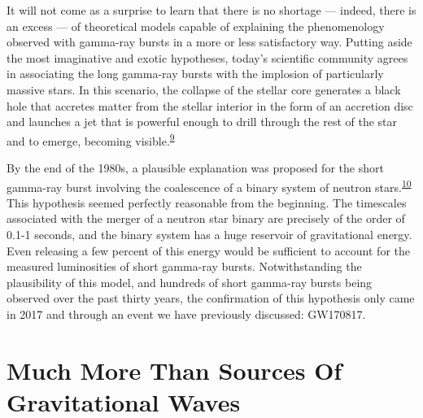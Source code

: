It will not come as a surprise to learn that there is no shortage --- indeed, there is
an excess --- of theoretical models capable of explaining the phenomenology observed
with gamma-ray bursts in a more or less satisfactory way. Putting aside the most
imaginative and exotic hypotheses, today's scientific community agrees in associating
the long gamma-ray bursts with the implosion of particularly massive stars. In this
scenario, the collapse of the stellar core generates a black hole that accretes matter
from the stellar interior in the form of an accretion disc and launches a
 jet that is powerful enough to drill through the rest of the star
and to emerge, becoming visible.\textsuperscript{\hyperlink{note:08-09}{9}}

By the end of the 1980s, a plausible explanation was proposed for the short gamma-ray
burst involving the coalescence of a binary system of neutron
stars.\textsuperscript{\hyperlink{note:08-10}{10}} This hypothesis seemed perfectly reasonable from the
beginning. The timescales associated with the merger of a neutron star binary are
precisely of the order of 0.1-1 seconds, and the binary system has a huge reservoir of
gravitational energy. Even releasing a few percent of this energy would be sufficient to
account for the measured luminosities of short gamma-ray bursts. Notwithstanding the
plausibility of this model, and hundreds of short gamma-ray bursts being observed over
the past thirty years, the confirmation of this hypothesis only came in 2017 and through
an event we have previously discussed: GW170817.

\section{Much More Than Sources Of Gravitational Waves}\label{sec:08-multimessenger}

